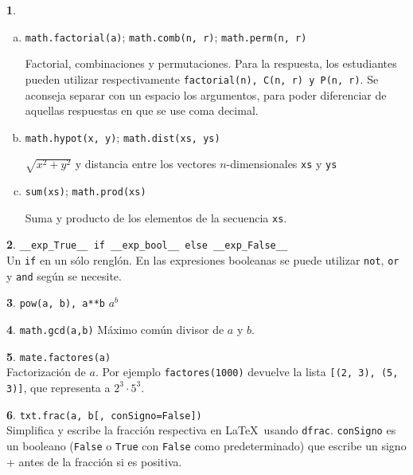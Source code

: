 \documentclass[12pt]{article}
\theoremstyle{definition}
\newtheorem{funcion}{}[section]
\begin{document}
\begin{funcion}
\begin{enumerate}[a)]
    \item \verb|math.factorial(a)|; \verb|math.comb(n, r)|; \verb|math.perm(n, r)|

      Factorial, combinaciones y permutaciones. Para la respuesta, los estudiantes pueden utilizar respectivamente \verb|factorial(n), C(n, r) y P(n, r)|. Se aconseja separar con un espacio los argumentos, para poder diferenciar de aquellas respuestas en que se use coma decimal.

    \item \verb|math.hypot(x, y)|; \verb|math.dist(xs, ys)|

      $\sqrt{x^2+y^2}$ y distancia entre los vectores $n$-dimensionales  \verb|xs| y \verb|ys|

    \item \verb|sum(xs)|; \verb|math.prod(xs)|

      Suma y producto de los elementos de la secuencia \verb|xs|.

  \end{enumerate}
\end{funcion}

\begin{funcion} \verb|__exp_True__ if __exp_bool__ else __exp_False__| \\[1ex]
  Un \verb|if| en un sólo renglón. En las expresiones booleanas se puede utilizar \verb|not|, \verb|or| y \verb|and| según se necesite.
\end{funcion}

\begin{funcion}
  \verb|pow(a, b), a**b| \quad
  $a^b$
\end{funcion}

\begin{funcion}
  \verb|math.gcd(a,b)| \quad
  Máximo común divisor de $a$ y $b$.
\end{funcion}

\begin{funcion}
  \verb|mate.factores(a)| \\[1ex]
  Factorización de $a$. Por ejemplo \verb|factores(1000)| devuelve la lista \verb|[(2, 3), (5, 3)]|, que representa a $2^3\cdot 5^3$.
\end{funcion}

\begin{funcion}
  \verb|txt.frac(a, b[, conSigno=False])| \\[1ex]
  Simplifica y escribe la fracción respectiva en \LaTeX\ usando \verb|dfrac|. \verb|conSigno| es un booleano (\verb|False| o \verb|True| con \verb|False| como predeterminado) que escribe un signo + antes de la fracción si es positiva.
\end{funcion}
\end{document}
